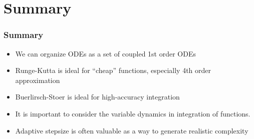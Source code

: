 \documentclass[10pt]{beamer}
\begin{document}
\section{Summary}

\begin{frame}
  \frametitle{Summary}
  \begin{itemize}
  \item We can organize ODEs as a set of coupled 1st order ODEs
  \item Runge-Kutta is ideal for ``cheap'' functions, especially 4th
    order approximation
  \item Buerlirsch-Stoer is ideal for high-accuracy integration
  \item It is important to consider the variable dynamics in
    integration of functions.
  \item Adaptive stepsize is often valuable as a way to generate
    realistic complexity
  \end{itemize}
\end{frame}
\end{document}
